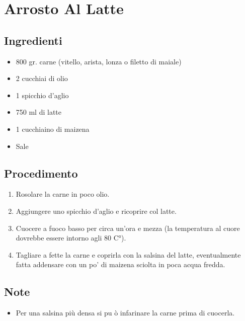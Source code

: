\section{Arrosto Al Latte}
\subsection{Ingredienti}
\begin{itemize}
\item 800 gr. carne (vitello, arista, lonza o filetto di maiale)  
\item 2 cucchiai di olio  
\item 1 spicchio d'aglio  
\item 750 ml di latte  
\item 1 cucchiaino di maizena  
\item Sale
\end{itemize}
\subsection{Procedimento}
\begin{enumerate}
\item  Rosolare la carne in poco olio.  
\item  Aggiungere uno spicchio d'aglio e ricoprire col latte.  
\item  Cuocere a fuoco basso per circa un'ora e mezza (la temperatura al cuore dovrebbe essere intorno agli 80 C°).  
\item  Tagliare a fette la carne e coprirla con la salsina del latte, eventualmente fatta addensare con un po' di maizena sciolta in poca acqua fredda.
\end{enumerate}
\subsection{Note}
\begin{itemize}
\item Per una salsina più densa si pu ò infarinare la carne prima di cuocerla.
\end{itemize}
